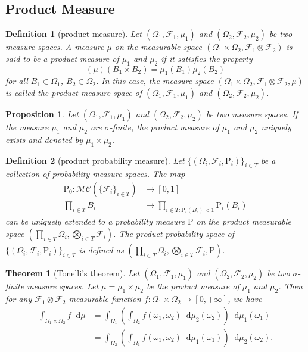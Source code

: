 \documentclass{report}
\newtheorem{definition}{Definition}[section]
\newtheorem{theorem}{Theorem}[section]
\newtheorem{proposition}{Proposition}[section]
\theoremstyle{nonumberplain}
\newcommand{\dif}{\mathop{}\!\mathrm{d}}
\begin{document}
\subsection{Product Measure}

\begin{definition}[product measure]
	Let $(\Omega_1,\mathcal{F}_1,\mu_1)$ and $(\Omega_2,\mathcal{F}_2,\mu_2)$ be two measure spaces. 
	A measure $\mu$ on the measurable space $(\Omega_1\times\Omega_2,\mathcal{F}_1\otimes\mathcal{F}_2)$ is said to be a \emph{product measure} of $\mu_1$ and $\mu_2$ if it satisfies the property
	\[
	\left(\mu\right)\left(B_{1} \times B_{2}\right)=\mu_{1}\left(B_{1}\right) \mu_{2}\left(B_{2}\right)
	\]
	for all $B_1\in\Omega_1$, $B_2\in\Omega_2$. In this case, the measure space $(\Omega_1\times\Omega_2,\mathcal{F}_1\otimes\mathcal{F}_2,\mu)$ is called the product measure space of $(\Omega_1,\mathcal{F}_1,\mu_1)$ and $(\Omega_2,\mathcal{F}_2,\mu_2)$.
\end{definition}

\begin{proposition}
	Let $(\Omega_1,\mathcal{F}_1,\mu_1)$ and $(\Omega_2,\mathcal{F}_2,\mu_2)$ be two measure spaces. If the measure $\mu_1$ and $\mu_2$ are $\sigma$-finite, the product measure of $\mu_1$ and $\mu_2$ uniquely exists and denoted by $\mu_1\times\mu_2$.
\end{proposition}

\begin{definition}[product probability measure]
	Let $\{(\Omega_i,\mathcal{F}_i,\mathrm{P}_i)\}_{i\in T}$ be a collection of probability measure spaces. 
	The map 
	\begin{align*}
	\mathrm{P}_0: \mathcal{MC}(\{\mathcal{F}_i\}_{i\in T})&\longrightarrow[0,1]\\
	\prod_{i\in T}B_i&\longmapsto\prod_{i\in T: \mathrm{P}_i(B_i)<1}\mathrm{P}_i\left(B_i\right)
	\end{align*}
	can be uniquely extended to a probability measure $\mathrm{P}$ on the product measurable space $\left(\prod_{i\in T}\Omega_i,\bigotimes_{i\in T}\mathcal{F}_i\right)$. The \emph{product probability space} of $\{(\Omega_i,\mathcal{F}_i,\mathrm{P}_i)\}_{i\in T}$ is defined as $\left(\prod_{i\in T}\Omega_i,\bigotimes_{i\in T}\mathcal{F}_i,\mathrm{P}\right)$.
\end{definition}

\begin{theorem}[Tonelli's theorem]
	Let $(\Omega_1,\mathcal{F}_1,\mu_1)$ and $(\Omega_2,\mathcal{F}_2,\mu_2)$ be two $\sigma$-finite measure spaces. Let $\mu=\mu_1\times\mu_2$ be the product measure of $\mu_1$ and $\mu_2$. Then for any $\mathcal{F}_1\otimes \mathcal{F}_2$-measurable function $f:\Omega_1\times\Omega_2\to[0,+\infty]$, we have
	\begin{align*}
		\int_{\Omega_1\times\Omega_2}f\dif\mu &= \int_{\Omega_1}\left(\int_{\Omega_2}f(\omega_1,\omega_2)\dif\mu_2(\omega_2)\right)\dif\mu_1(\omega_1)\\
		&= \int_{\Omega_2}\left(\int_{\Omega_1}f(\omega_1,\omega_2)\dif\mu_1(\omega_1)\right)\dif\mu_2(\omega_2).
	\end{align*}
\end{theorem}
\end{document}
